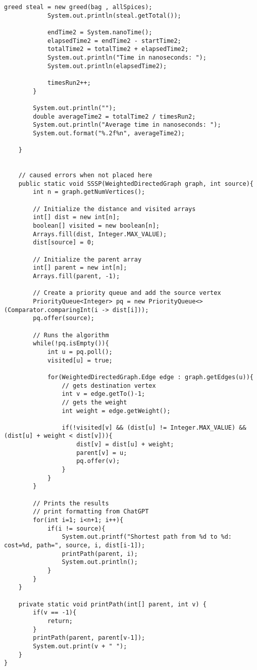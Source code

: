 \documentclass[10pt]{article}
\begin{document}
\begin{lstlisting}[frame=single, ]
            greed steal = new greed(bag , allSpices);
            System.out.println(steal.getTotal());

            endTime2 = System.nanoTime();
            elapsedTime2 = endTime2 - startTime2;
            totalTime2 = totalTime2 + elapsedTime2;
            System.out.println("Time in nanoseconds: ");
            System.out.println(elapsedTime2);

            timesRun2++;
        }

        System.out.println("");
        double averageTime2 = totalTime2 / timesRun2;
        System.out.println("Average time in nanoseconds: ");
        System.out.format("%.2f%n", averageTime2);
        
    }


    // caused errors when not placed here
    public static void SSSP(WeightedDirectedGraph graph, int source){
        int n = graph.getNumVertices();
            
        // Initialize the distance and visited arrays
        int[] dist = new int[n];
        boolean[] visited = new boolean[n];
        Arrays.fill(dist, Integer.MAX_VALUE);
        dist[source] = 0;
    
        // Initialize the parent array
        int[] parent = new int[n];
        Arrays.fill(parent, -1);
    
        // Create a priority queue and add the source vertex
        PriorityQueue<Integer> pq = new PriorityQueue<>(Comparator.comparingInt(i -> dist[i]));
        pq.offer(source);
    
        // Runs the algorithm
        while(!pq.isEmpty()){
            int u = pq.poll();
            visited[u] = true;
                
            for(WeightedDirectedGraph.Edge edge : graph.getEdges(u)){
                // gets destination vertex
                int v = edge.getTo()-1;
                // gets the weight
                int weight = edge.getWeight();
                
                if(!visited[v] && (dist[u] != Integer.MAX_VALUE) && (dist[u] + weight < dist[v])){
                    dist[v] = dist[u] + weight;
                    parent[v] = u;
                    pq.offer(v);
                }
            }
        }
    
        // Prints the results
        // print formatting from ChatGPT
        for(int i=1; i<n+1; i++){
            if(i != source){
                System.out.printf("Shortest path from %d to %d: cost=%d, path=", source, i, dist[i-1]);
                printPath(parent, i);
                System.out.println();
            }
        }
    }
    
    private static void printPath(int[] parent, int v) {
        if(v == -1){
            return;
        }
        printPath(parent, parent[v-1]);
        System.out.print(v + " ");
    }
}
\end{lstlisting}
\end{document}

